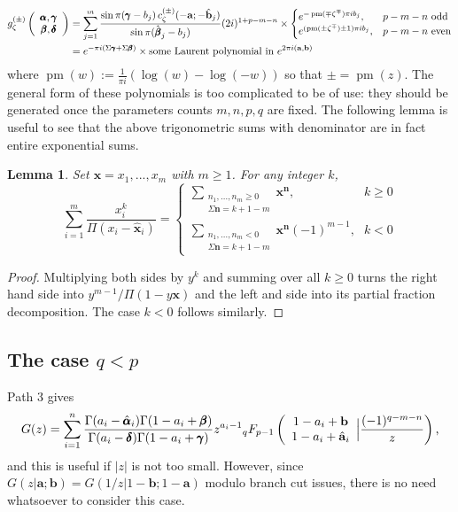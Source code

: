 \documentclass[12pt]{article}
\newcommand{\ee}[0] {e}
\newcommand{\ii}[0] {i}
\numberwithin{equation}{section}
\newtheorem{lemma}[theorem]{Lemma}
\newcommand{\FF}[6] {{}_{#1}{#2}_{#3} \left( \begin{array}{c} #4 \\ #5 \end{array} \Big| #6  \right)}
\newcommand{\bfa}[0] {\mathbf{a}}
\newcommand{\bfb}[0] {\mathbf{b}}
\newcommand{\bfn}[0] {\mathbf{n}}
\newcommand{\bfx}[0] {\mathbf{x}}
\begin{document}
\begin{align*}
g_{\zeta}^{(\pm)}\left(\begin{array}{c} \bfalpha, \bfgamma \\ \bfbeta, \bfdelta \end{array}\right) &= \sum_{j=1}^{m} \frac{\sin \pi (\bfgamma - b_j) \, c_{\zeta}^{(\pm)}(-\bfa; -\hat{\bfb}_j)}{\sin \pi (\hat{\bfbeta}_j-b_j)} (2 \ii)^{1+p-m-n} \times \begin{cases} \ee^{-\operatorname{pm}(\mp \zeta^{\mp})\pi \ii b_j}\text{,}& p-m-n \text{ odd}\\
\ee^{(\operatorname{pm}(\pm \zeta^{\mp}) \pm 1) \pi \ii b_j}\text{,}& p-m-n \text{ even}\end{cases}\\
&= \ee^{-\pi \ii (\Sigma \bfgamma + \Sigma \bfbeta)} \times \text{some Laurent polynomial in } \ee^{2\pi \ii (\bfa, \bfb)}
\end{align*}
where $\operatorname{pm}(w) := \frac{1}{\pi \ii}(\log(w)-\log(-w))$ so that $\pm = \operatorname{pm}(z)$. The general form of these polynomials is too complicated to be of use: they should be generated once the parameters counts $m,n,p,q$ are fixed. The following lemma is useful to see that the above trigonometric sums with denominator are in fact entire exponential sums.
\begin{lemma}
\label{lemmatrig}
Set $\bfx = x_1, ..., x_m$ with $m \ge 1$. For any integer $k$,
\begin{equation*}
\sum_{i=1}^{m} \frac{x_i^k}{\Pi(x_i-\hat{\bfx}_i)} = \begin{cases} \sum\limits_{\substack{n_1, \dots, n_m \ge 0 \\ \Sigma \bfn = k+1-m}} \bfx^\bfn \text{,} & k \ge 0\\
\sum\limits_{\substack{n_1, \dots, n_m < 0 \\ \Sigma \bfn = k+1-m}} \bfx^{\bfn} (-1)^{m-1} \text{,} & k < 0
\end{cases}
\end{equation*}
\end{lemma}
\begin{proof}
Multiplying both sides by $y^k$ and summing over all $k \ge 0$ turns the right hand side into $y^{m-1} / \Pi(1-y\bfx)$ and the left and side into its partial fraction decomposition. The case $k < 0$ follows similarly.
\end{proof}

\subsection{The case $q<p$}
Path 3 gives
\begin{equation}
\label{eq_Gpath3}
G(z) = \sum_{i=1}^{n} \frac{\Gamma(a_i-\hat{\bfalpha}_i)\Gamma(1-a_i+\bfbeta)}{\Gamma(a_i-\bfdelta)\Gamma(1-a_i+\bfgamma)} z^{a_i-1}\FF{q}{F}{p-1}{1-a_i+\bfb}{1-a_i+\hat{\bfa}_i}{\frac{(-1)^{q-m-n}}{z}}\text{,}
\end{equation}
and this is useful if $|z|$ is not too small. However, since $G(z|\bfa; \bfb) = G(1/z|1-\bfb; 1-\bfa)$ modulo branch cut issues, there is no need whatsoever to consider this case.
\end{document}
